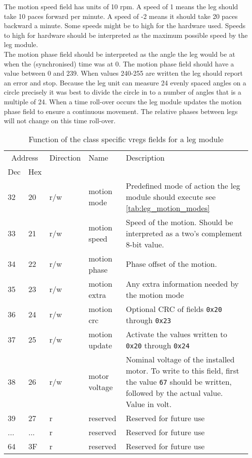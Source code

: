 The motion speed field has units of 10 rpm. A speed of 1 means the leg should take 10 paces forward per minute.
A speed of -2 means it should take 20 paces backward a minute. 
Some speeds might be to high for the hardware used.
Speeds to high for hardware should be interpreted as the maximum possible speed by the leg module.\\
The motion phase field should be interpreted as the angle the leg would be at when the (synchronised) time was at 0.
The motion phase field should have a value between 0 and 239. When values 240-255 are written the leg should report an error and stop.
Because the leg unit can measure 24 evenly spaced angles on a circle precisely it was best to divide the circle in to a number of angles that is a multiple of 24.
When a time roll-over occurs the leg module updates the motion phase field to ensure a continuous movement. The relative phases between legs will not change on this time roll-over.


\begin{table}[H]
    \begin{center}
    \caption{Function of the class specific vregs fields for a leg module}
    \label{tab:class_leg_fields}
    \begin{tabularx}{\textwidth}{llllX}
    \toprule
    \multicolumn{2}{c}{Address} & Direction & Name & Description \\
    Dec & Hex &   &   \\
    \midrule
    32 & 20 & r/w & motion mode   & Predefined mode of action the leg module should execute see \cref{tab:leg_motion_modes} \\
    33 & 21 & r/w & motion speed  & Speed of the motion. Should be interpreted as a two's complement 8-bit value.\\
    34 & 22 & r/w & motion phase  & Phase offset of the motion.\\
    35 & 23 & r/w & motion extra  & Any extra information needed by the motion mode \\
    36 & 24 & r/w & motion crc    & Optional CRC of fields \verb|0x20| through \verb|0x23| \\
    37 & 25 & r/w & motion update & Activate the values written to  \verb|0x20| through \verb|0x24| \\
    38 & 26 & r/w & motor voltage & Nominal voltage of the installed motor. To write to this field,
                                    first the value \verb|67| should be written, followed by the actual value. 
                                    Value in volt.\\
    39 & 27 & r & reserved      & Reserved for future use \\
    ... & ... & r &  reserved    & Reserved for future use \\
    64 & 3F & r &  reserved      & Reserved for future use \\
    \bottomrule
    \end{tabularx}
    \end{center}
\end{table}

